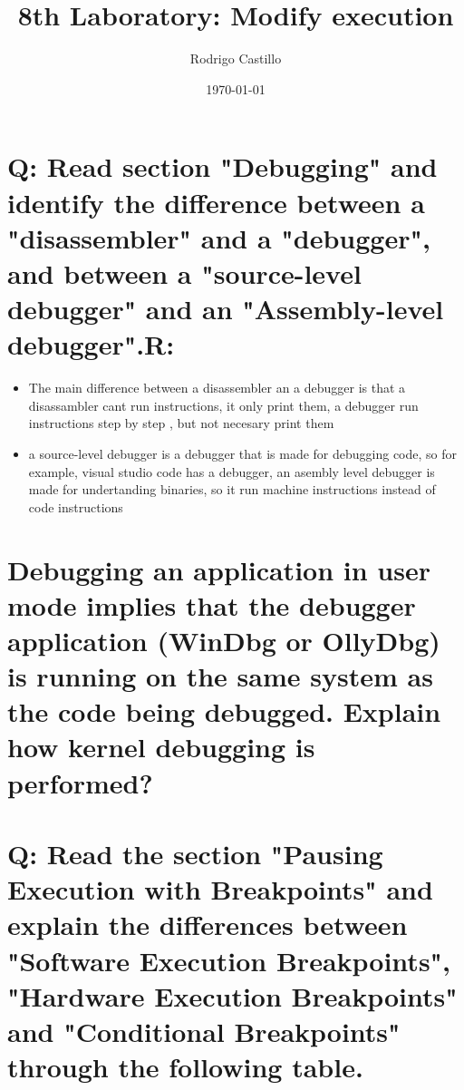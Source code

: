 \documentclass[10pt,a4paper]{article} %
\begin{document}
    \title{{  8th Laboratory: Modify execution  }}
    \author{{Rodrigo Castillo}}
    \date{\today}

    \maketitle


    \section{Q: Read section "Debugging" and identify the difference between a
    "disassembler" and a "debugger", and between a "source-level debugger" and
    an "Assembly-level debugger".R:}

        \begin{itemize}
            \item {The main difference between a disassembler an a debugger is
                that a disassambler cant run instructions, it only print them,
            a debugger run instructions step by step , but not necesary print them}

            \item {a source-level debugger is a debugger that is made for
                debugging code, so for example, visual studio code has a
            debugger, an asembly level debugger is made for undertanding
            binaries, so it run machine instructions instead of code instructions}
        \end{itemize}


    \section{Debugging an application in user mode implies that the debugger
    application (WinDbg or OllyDbg) is running on the same system as the code
    being debugged. Explain how kernel debugging is performed?}






    \section{Q: Read the section "Pausing Execution with Breakpoints" and
    explain the differences between "Software Execution Breakpoints", "Hardware
    Execution Breakpoints" and "Conditional Breakpoints" through the following
    table.}
\end{document}
